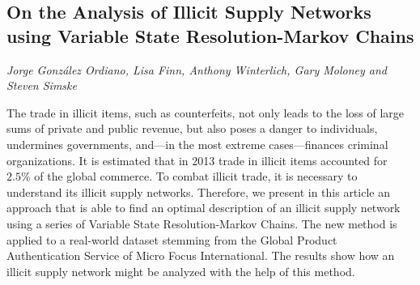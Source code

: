 \documentclass[../booklet.tex]{subfiles}
\begin{document}
\subsection[On the Analysis of Illicit Supply Networks using Variable State Resolution-Markov Chains. {\it Jorge González Ordiano, Lisa Finn, Anthony Winterlich, Gary Moloney and Steven Simske}]{On the Analysis of Illicit Supply Networks using Variable State Resolution-Markov Chains}
    

\begin{center}
  {\it Jorge González Ordiano, Lisa Finn, Anthony Winterlich, Gary Moloney and Steven Simske}
\end{center}

\vskip 0.8cm


The trade in illicit items, such as counterfeits, not only leads to the loss of large sums of private and public revenue, but also poses a danger to individuals, undermines governments, and---in the most extreme cases---finances criminal organizations. It is estimated that in 2013 trade in illicit items accounted for $2.5\%$ of the global commerce. To combat illicit trade, it is necessary to understand its illicit supply networks. Therefore, we present in this article an approach that is able to find an optimal description of an illicit supply network using a series of Variable State Resolution-Markov Chains. The new method is applied to a real-world dataset stemming from the Global Product Authentication Service of Micro Focus International. The results show how an illicit supply network might be analyzed with the help of this method.

\end{document}
